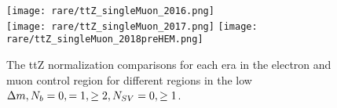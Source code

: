 \begin{figure}[!h]
	\begin{center}
  \texttt{[image: rare/ttZ\_singleMuon\_2016.png]} \\
  \texttt{[image: rare/ttZ\_singleMuon\_2017.png]} 
  \texttt{[image: rare/ttZ\_singleMuon\_2018preHEM.png]}

	\end{center}
	\caption[ttZ Normalization Comparisons]{The ttZ normalization comparisons for each era in the electron and muon control region for different regions in the low $\Delta m, N_{b}=0,=1,\geq2, N_{SV}=0,\geq1$.
	 }
	\label{fig:rare-norm-comp}
\end{figure}
